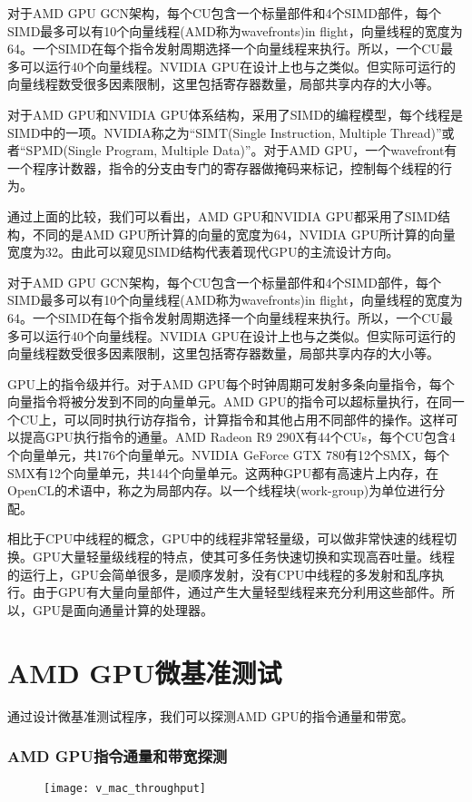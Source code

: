 对于AMD GPU GCN架构，每个CU包含一个标量部件和4个SIMD部件，每个SIMD最多可以有10个向量线程(AMD称为wavefronts)in flight，向量线程的宽度为64。一个SIMD在每个指令发射周期选择一个向量线程来执行。所以，一个CU最多可以运行40个向量线程。NVIDIA GPU在设计上也与之类似。但实际可运行的向量线程数受很多因素限制，这里包括寄存器数量，局部共享内存的大小等。

对于AMD GPU和NVIDIA GPU体系结构，采用了SIMD的编程模型，每个线程是SIMD中的一项。NVIDIA称之为“SIMT(Single Instruction, Multiple Thread)”或者“SPMD(Single Program, Multiple Data)”。对于AMD GPU，一个wavefront有一个程序计数器，指令的分支由专门的寄存器做掩码来标记，控制每个线程的行为。

通过上面的比较，我们可以看出，AMD GPU和NVIDIA GPU都采用了SIMD结构，不同的是AMD GPU所计算的向量的宽度为64，NVIDIA GPU所计算的向量宽度为32。由此可以窥见SIMD结构代表着现代GPU的主流设计方向。

对于AMD GPU GCN架构，每个CU包含一个标量部件和4个SIMD部件，每个SIMD最多可以有10个向量线程(AMD称为wavefronts)in flight，向量线程的宽度为64。一个SIMD在每个指令发射周期选择一个向量线程来执行。所以，一个CU最多可以运行40个向量线程。NVIDIA GPU在设计上也与之类似。但实际可运行的向量线程数受很多因素限制，这里包括寄存器数量，局部共享内存的大小等。

GPU上的指令级并行。对于AMD GPU每个时钟周期可发射多条向量指令，每个向量指令将被分发到不同的向量单元。AMD GPU的指令可以超标量执行，在同一个CU上，可以同时执行访存指令，计算指令和其他占用不同部件的操作。这样可以提高GPU执行指令的通量。AMD Radeon R9 290X有44个CUs，每个CU包含4个向量单元，共176个向量单元。NVIDIA GeForce GTX 780有12个SMX，每个SMX有12个向量单元，共144个向量单元。这两种GPU都有高速片上内存，在OpenCL的术语中，称之为局部内存。以一个线程块(work-group)为单位进行分配。

相比于CPU中线程的概念，GPU中的线程非常轻量级，可以做非常快速的线程切换。GPU大量轻量级线程的特点，使其可多任务快速切换和实现高吞吐量。线程的运行上，GPU会简单很多，是顺序发射，没有CPU中线程的多发射和乱序执行。由于GPU有大量向量部件，通过产生大量轻型线程来充分利用这些部件。所以，GPU是面向通量计算的处理器。




\section{AMD GPU微基准测试}
通过设计微基准测试程序，我们可以探测AMD GPU的指令通量和带宽。


\subsubsection{AMD GPU指令通量和带宽探测}
\begin{figure}[htbp]
	\centering
	\texttt{[image: v\_mac\_throughput]}
	\label{fig:v_mac_throughput}
\end{figure}

